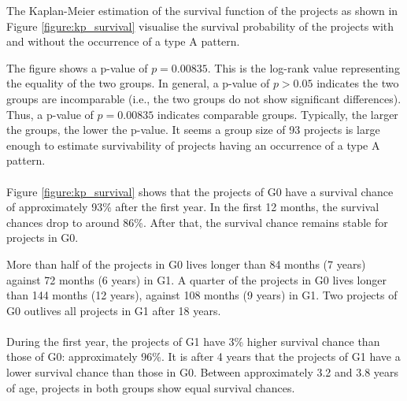

\noindent
The Kaplan-Meier estimation of the survival function of the projects as shown
in Figure \ref{figure:kp_survival} visualise the survival probability of
the projects with and without the occurrence of a type A pattern.

The figure shows a p-value of $p = 0.00835$. This is the log-rank value
representing the equality of the two groups. In general, a p-value of $p >
0.05$ indicates the two groups are incomparable (i.e., the two groups do not
show significant differences). Thus, a p-value of $p = 0.00835$ indicates
comparable groups. Typically, the larger the groups, the lower the p-value.
It seems a group size of 93 projects is large enough to estimate survivability
of projects having an occurrence of a type A pattern.

\paragraph{}
Figure \ref{figure:kp_survival} shows that the projects of G0 have a survival
chance of approximately 93\% after the first year. In the first 12 months, the
survival chances drop to around 86\%. After that, the survival chance remains
stable for projects in G0.

More than half of the projects in G0 lives longer than 84 months (7 years)
against 72 months (6 years) in G1. A quarter of the projects in G0 lives longer
than 144 months (12 years), against 108 months (9 years) in G1. Two projects of
G0 outlives all projects in G1 after 18 years.

\paragraph{}
During the first year, the projects of G1 have 3\% higher survival chance than
those of G0: approximately 96\%. It is after 4 years that the projects of G1
have a lower survival chance than those in G0. Between approximately 3.2 and
3.8 years of age, projects in both groups show equal survival chances.

\begin{comment}
- Factual results
- Tables and figures for clarification

This chapter presents and clarifies the results obtained during the research.
The focus should be on the factual results, not the interpretation or
discussion. Tables and graphics should be used to increase the clarity of the
results where applicable.
Have a look at the the results chapter in this example thesis on Paul’s
homepage\footnote{http://homepages.cwi.nl/~paulk/thesesMasterSoftwareEngineering/2006/ArnoldLankamp.pdf}.
\end{comment}
